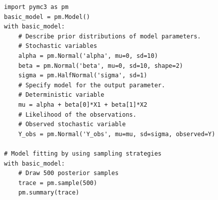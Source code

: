 \documentclass{article}
\begin{document}
\begin{minipage}{\linewidth}
\begin{lstlisting}[caption={Example code of a simple Bayesian model using PyMC3}, label={list:pymc3_example_code},captionpos=b]
import pymc3 as pm
basic_model = pm.Model()
with basic_model:
    # Describe prior distributions of model parameters. 
    # Stochastic variables
    alpha = pm.Normal('alpha', mu=0, sd=10)
    beta = pm.Normal('beta', mu=0, sd=10, shape=2)
    sigma = pm.HalfNormal('sigma', sd=1)
    # Specify model for the output parameter. 
    # Deterministic variable
    mu = alpha + beta[0]*X1 + beta[1]*X2
    # Likelihood of the observations. 
    # Observed stochastic variable
    Y_obs = pm.Normal('Y_obs', mu=mu, sd=sigma, observed=Y)
	
# Model fitting by using sampling strategies   
with basic_model:
    # Draw 500 posterior samples
    trace = pm.sample(500)
    pm.summary(trace)
\end{lstlisting}
\end{minipage}



\end{document}
